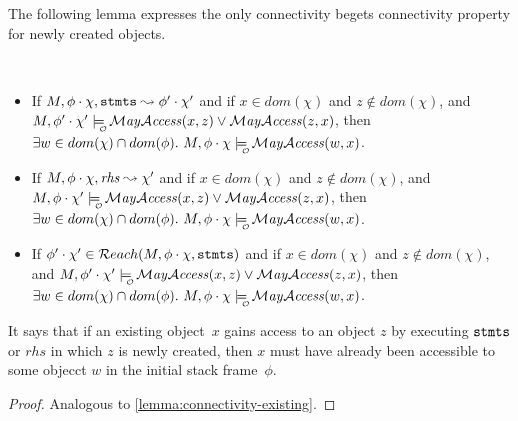 The following lemma expresses the only connectivity begets connectivity
property for newly created objects.

\begin{lemma}
\label{lemma:connectivity-new}\ \\
\begin{itemize}
\item {If $M, \phi \cdot \chi, {\textrm{\ttfamily{stmts}}} \leadsto \phi' \cdot \chi'$ and if $x \in dom(\chi)$ and $z \not\in dom(\chi)$, and
$\M, \phi' \cdot \chi' \modelsWithO   \MayAccess(x,z) \lor \MayAccess(z,x)$, then\\
$\exists w \in dom(\chi) \cap dom(\phi).\
\M, \phi \cdot \chi \modelsWithO   \MayAccess(w,x)$.}

\item {If $M, \phi \cdot \chi, \mathit{rhs} \leadsto \chi'$ and if
$x \in dom(\chi)$ and $z \not\in dom(\chi)$, and
$\M, \phi \cdot \chi' \modelsWithO   \MayAccess(x,z) \lor \MayAccess(z,x)$, then\\
$\exists w \in dom(\chi) \cap dom(\phi).\
\M, \phi \cdot \chi \modelsWithO   \MayAccess(w,x)$.}


\item {If $\phi' \cdot \chi' \in {\mathcal{R}each}(M,\phi \cdot \chi,{{\textrm{\ttfamily{stmts}}}})$
and if $x \in dom(\chi)$ and $z \not\in dom(\chi)$, and
$\M, \phi' \cdot \chi' \modelsWithO   \MayAccess(x,z) \lor \MayAccess(z,x)$, then\\
$\exists w \in dom(\chi) \cap dom(\phi).\
\M, \phi \cdot \chi \modelsWithO   \MayAccess(w,x)$.}

\end{itemize}
\end{lemma}

It says that if an existing object~$x$ gains access to an object
$z$ by executing ${{\textrm{\ttfamily{stmts}}}}$ or $\mathit{rhs}$ in which $z$ is newly created, then
$x$ must have already been accessible to some objecct $w$ in the initial stack
frame~$\phi$.

\begin{proof}
Analogous to \autoref{lemma:connectivity-existing}.
\end{proof}







